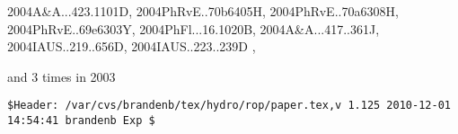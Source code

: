 \documentclass[12pt]{article}
\begin{document}
\begin{description}
{2004A&A...423.1101D,%
2004PhRvE..70b6405H,%
2004PhRvE..70a6308H,%
2004PhRvE..69e6303Y,%
2004PhFl...16.1020B,%
2004A&A...417..361J,%
2004IAUS..219..656D,%
2004IAUS..223..239D%
},\item
and 3 times in 2003 \citep{
2003A&A...411..321Y,%
2003ApJ...597L.141H,%
2003PhRvE..68b6304D%
}
\end{description}

\def\nat    {Nature}
\def\apss   {Astrophys. Space Sci.}
\def\araa   {Ann.\ Rev.\ Astron.\ Astrophys.}
\def\prd    {Phys.\ Rev.\ D}
\def\pre    {Phys.\ Rev.\ E}
\def\apj    {Astrophys.\ J.}
\def\apjl   {Astrophys.\ J.\ Lett.}
\def\apjs   {Astrophys.\ J.\ Supp.}
\def\mnras  {Month.\ Not.\ Roy.\ Astron.\ Soc.}
\def\physrep{Phys.\ Rep.}
\def\aap    {Astron.\ Astrophys.}
\def\jgr    {J.\ Geophys.\ Res.}
\def\grl    {Geophys.\ Res.\ Lett.}
\def\solphys{Sol.\ Phys.}
\def\ssr    {Space Sci.\ Ref.}
\def\memsai {Mem.\ Soc.\ Astr.\ Ital.}



\vfill\bigskip\noindent\tiny\begin{verbatim}
$Header: /var/cvs/brandenb/tex/hydro/rop/paper.tex,v 1.125 2010-12-01 14:54:41 brandenb Exp $
\end{verbatim}
\end{document}
